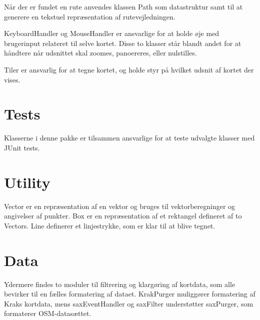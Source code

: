 Når der er fundet en rute anvendes klassen Path som datastruktur samt til at generere en tekstuel repræsentation af rutevejledningen.

KeyboardHandler og MouseHandler er ansvarlige for at holde øje med brugerinput relateret til selve kortet. Disse to klasser står blandt andet for at håndtere når udsnittet skal zoomes, panoereres, eller nulstilles.

Tiler er ansvarlig for at tegne kortet, og holde styr på hvilket udsnit af kortet der vises.

\section{Tests}
\label{sec:tests}

Klasserne i denne pakke er tilsammen ansvarlige for at teste udvalgte klasser med JUnit tests.

\section{Utility}

Vector er en repræsentation af en vektor og bruges til vektorberegninger og angivelser af punkter. Box er en repræsentation af et rektangel defineret af to Vectors. Line definerer et linjestrykke, som er klar til at blive tegnet.

\section{Data}

Ydermere findes to moduler til filtrering og klargøring af kortdata, som alle bevirker til en fælles formatering af dataet. KrakPurger muliggører formatering af Kraks kortdata, mens saxEventHandler og saxFilter understøtter saxPurger, som formaterer OSM-datasættet.